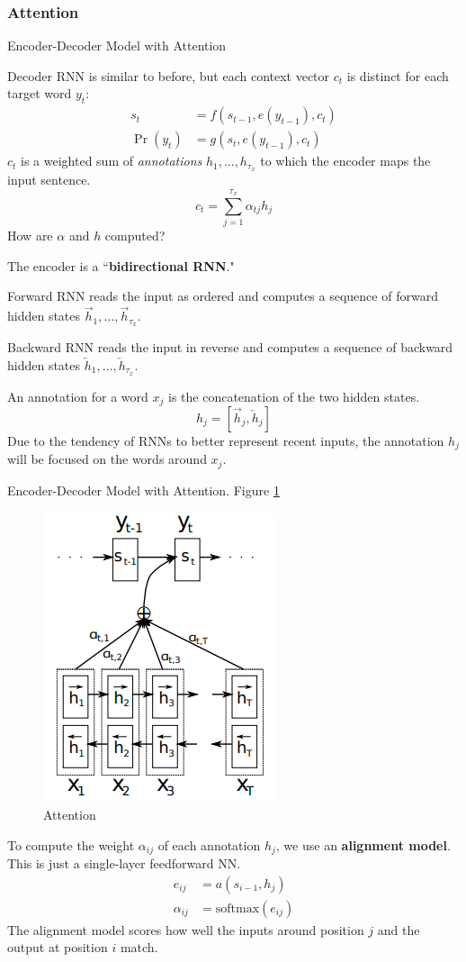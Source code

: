 \documentclass[english]{article}
\begin{document}
\subsubsection{Attention}
\benum
\item 
 {Encoder-Decoder Model with Attention}

Decoder RNN is similar to before, but each context vector $c_t$ is distinct for each target word $y_t$:
\begin{align*}
s_t &= f(s_{t-1}, e(y_{t-1}), c_t)\\
\Pr(y_t) &= g(s_t, e(y_{t-1}), c_t)
\end{align*}
$c_t$ is a weighted sum of \textit{annotations} $h_1,\dots,h_{\tau_x}$ to which the encoder maps the input sentence.
$$c_t = \sum_{j=1}^{\tau_x} \alpha_{tj}h_j$$
How are $\alpha$ and $h$ computed?
 

\item 
The encoder is a ``\textbf{bidirectional RNN}."
 
Forward RNN reads the input as ordered and computes a sequence of forward hidden states $\overrightarrow{h}_1,\dots,\overrightarrow{h}_{\tau_x}$.
 
Backward RNN reads the input in reverse and computes a sequence of backward hidden states $\overleftarrow{h}_1,\dots,\overleftarrow{h}_{\tau_x}$.
 
An annotation for a word $x_j$ is the concatenation of the two hidden states.
$$h_j=\left[\overrightarrow{h}_j, \overleftarrow{h}_j\right]$$
Due to the tendency of RNNs to better represent recent inputs, the annotation $h_j$ will be focused on the words around $x_j$.
 

\item 
 {Encoder-Decoder Model with Attention}.  Figure \ref{Attention}

\begin{figure}
\centering
\includegraphics[height=0.35\linewidth]{attention.png}
\caption{Attention}
\label{Attention}
\end{figure}
To compute the weight $\alpha_{ij}$ of each annotation $h_j$, we use an \textbf{alignment model}. This is just a single-layer feedforward NN.
\begin{align*}
e_{ij} &= a(s_{i-1}, h_j)\\
\alpha_{ij} &= \text{softmax}(e_{ij})
\end{align*}
The alignment model scores how well the inputs around position $j$ and the output at position $i$ match.
\end{document}
